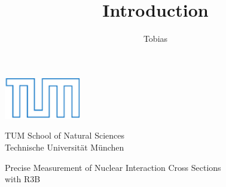 \documentclass[12pt,twoside]{article}
\title{Introduction}
\author{Tobias}
\begin{document}
  \begin{titlepage}
\thispagestyle{empty}

\begin{center}
  \includegraphics[width=0.25\textwidth]{Figures/TUMLogo_oZ_Outline_blau_CMYK-eps-converted-to.pdf}
  
  \vspace{1em}
  \Large TUM School of Natural Sciences\\
  \vspace{1em}
  \large Technische Universit\"at M\"unchen\\
   \vspace{0.5em}
  \vspace{0.5em}
  
\end{center}

{%
  \centering %
  \vspace*{\baselineskip} %
  
  
	{\Large Precise Measurement of Nuclear Interaction Cross Sections  \\[0.3\baselineskip] with R3B    \\[0.3\baselineskip]
	}

  
}
\end{titlepage}
\end{document}
